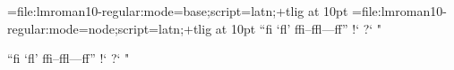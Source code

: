 

\font\testa={file:lmroman10-regular:mode=base;script=latn;+tlig} at 10pt
\font\testb={file:lmroman10-regular:mode=node;script=latn;+tlig} at 10pt
\testa ``fi `fl' ffi--ffl---ff'' !` ?` "\par
\testb ``fi `fl' ffi--ffl---ff'' !` ?` "\par
\bye
